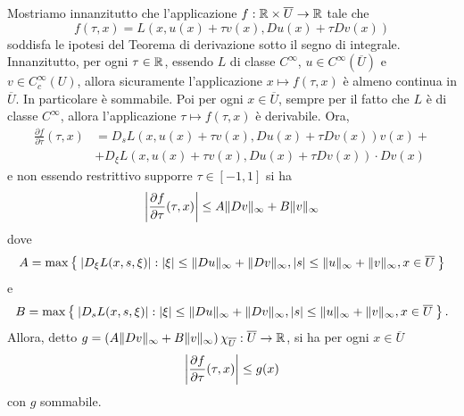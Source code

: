 Mostriamo innanzitutto che l'applicazione $f: \R \times \overline{U} \to \R $ tale che
\[ f(\tau, x) = L(x,u(x)+\tau v(x),Du(x)+\tau Dv(x)) \]
soddisfa le ipotesi del Teorema di derivazione sotto il segno di integrale. Innanzitutto, per ogni $\tau \in \R$, essendo $L$ di classe $C^\infty$, $u \in C^\infty(\overline{U})$ e $v \in C^\infty_c(U)$, allora sicuramente l'applicazione ${x \mapsto f(\tau,x)}$ è almeno continua in $\overline{U}$. In particolare è sommabile. Poi per ogni $x \in \overline{U}$, sempre per il fatto che $L$ è di classe $C^\infty$, allora l'applicazione ${\tau \mapsto f(\tau,x)}$ è derivabile. Ora,
\begin{align*}
	\frac{\partial f}{\partial \tau}(\tau,x) &= D_sL(x,u(x)+\tau v(x),Du(x)+ \tau Dv(x))v(x) + \\
	&+D_{\xi}L(x,u(x)+\tau v(x),Du(x)+\tau Dv(x))\cdot Dv(x)
\end{align*}
e non essendo restrittivo supporre $\tau \in [-1,1]$ si ha 
\[ \abs*{\frac{\partial f}{\partial \tau}(\tau,x)} \le A\norm{Dv}_\infty + B\norm{v}_\infty \]
dove 
\[ A = \max\Set{\abs{D_\xi L(x,s,\xi)} : \abs{\xi} \le \norm{Du}_\infty + \norm{Dv}_\infty, \abs{s} \le \norm{u}_\infty + \norm{v}_\infty, x \in \overline{U}} \]
e 
\[ B = \max\Set{\abs{D_s L(x,s,\xi)} : \abs{\xi} \le \norm{Du}_\infty + \norm{Dv}_\infty, \abs{s} \le \norm{u}_\infty + \norm{v}_\infty, x \in \overline{U}}. \]
Allora, detto $g = \left( A\norm{Dv}_\infty + B\norm{v}_\infty\right)\chi_{\overline{U}} : \overline{U} \to \R$, si ha per ogni $x \in \overline{U}$
\[ \abs*{\frac{\partial f}{\partial \tau}(\tau,x)} \le g(x) \]
con $g$ sommabile. 

